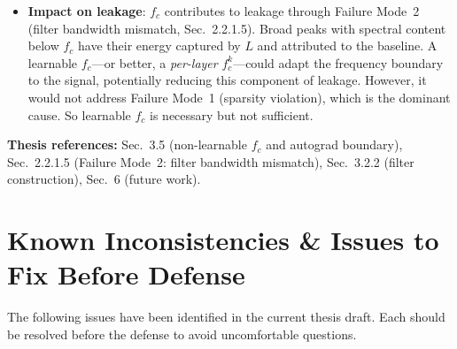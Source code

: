 \documentclass[11pt, letterpaper]{article}
\begin{document}
\begin{answerbox}
\begin{itemize}[nosep]
        in development created a technical debt that blocked learnable
        $f_c$.  The FIR workaround was identified late and deprioritized
        relative to the loss engineering experiments.  In hindsight,
        learnable $f_c$ via FIR would have been higher-impact than
        the 12-term loss function.
  \item \textbf{Impact on leakage}: $f_c$ contributes to leakage
        through Failure Mode~2 (filter bandwidth mismatch, Sec.~2.2.1.5).
        Broad peaks with spectral content below $f_c$ have their
        energy captured by $L$ and attributed to the baseline.  A
        learnable $f_c$---or better, a \emph{per-layer} $f_c^k$---could
        adapt the frequency boundary to the signal, potentially reducing
        this component of leakage.  However, it would not address
        Failure Mode~1 (sparsity violation), which is the dominant
        cause.  So learnable $f_c$ is necessary but not sufficient.
\end{itemize}
\textbf{Thesis references:} Sec.~3.5 (non-learnable $f_c$ and autograd boundary),
Sec.~2.2.1.5 (Failure Mode~2: filter bandwidth mismatch),
Sec.~3.2.2 (filter construction),
Sec.~6 (future work).
\end{answerbox}


\newpage
\section{Known Inconsistencies \& Issues to Fix Before Defense}

\begin{warnbox}
The following issues have been identified in the current thesis draft.
Each should be resolved before the defense to avoid uncomfortable questions.
\end{warnbox}

\vspace{0.5em}
\end{document}
